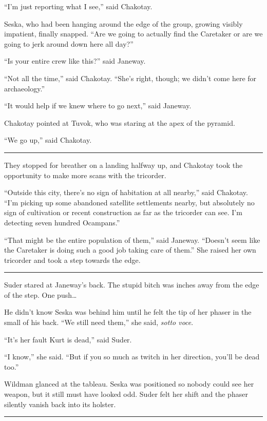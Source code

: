 \documentclass[twoside,letterpaper,12pt]{memoir}
\begin{document}
``I'm just reporting what I see,'' said Chakotay. 

Seska, who had been hanging around the edge of the group, growing visibly impatient, finally snapped. ``Are we going to actually find the Caretaker or are we going to jerk around down here all day?'' 

``Is your entire crew like this?'' said Janeway. 

``Not all the time,'' said Chakotay. ``She's right, though; we didn't come here for archaeology.'' 

``It would help if we knew where to go next,'' said Janeway. 

Chakotay pointed at Tuvok, who was staring at the apex of the pyramid. 

``We go up,'' said Chakotay. 

\fancybreak{\rule{3cm}{0.4 pt}} 

They stopped for breather on a landing halfway up, and Chakotay took the opportunity to make more scans with the tricorder. 

``Outside this city, there's no sign of habitation at all nearby,'' said Chakotay. ``I'm picking up some abandoned satellite settlements nearby, but absolutely no sign of cultivation or recent construction as far as the tricorder can see. I'm detecting seven hundred Ocampans.'' 

``That might be the entire population of them,'' said Janeway. ``Doesn't seem like the Caretaker is doing such a good job taking care of them.'' She raised her own tricorder and took a step towards the edge. 

\fancybreak{\rule{3cm}{0.4 pt}} 

Suder stared at Janeway's back. The stupid bitch was inches away from the edge of the step. One push\ldots  

He didn't know Seska was behind him until he felt the tip of her phaser in the small of his back. ``We still need them,'' she said, \textit{sotto voce}. 

``It's her fault Kurt is dead,'' said Suder. 

``I know,'' she said. ``But if you so much as twitch in her direction, you'll be dead too.'' 

Wildman glanced at the tableau. Seska was positioned so nobody could see her weapon, but it still must have looked odd. Suder felt her shift and the phaser silently vanish back into its holster. 

\fancybreak{\rule{3cm}{0.4 pt}} 
\end{document}
